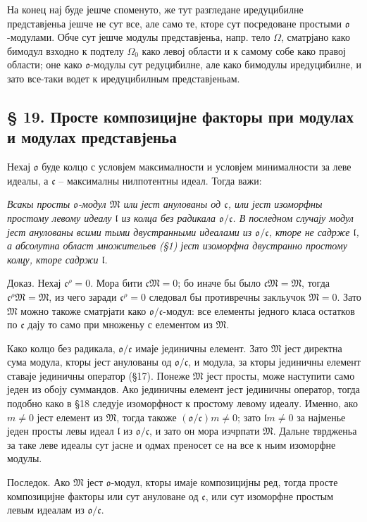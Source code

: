 ﻿\documentclass[11pt]{article}
\providecommand{\mo}{\mathfrak{o}}
\providecommand{\ml}{\mathfrak{l}}
\providecommand{\mc}{\mathfrak{c}}
\providecommand{\mM}{\mathfrak{M}}
\begin{document}
На конец нај буде јешче споменуто, же тут разгледане иредуцибилне представјеньа јешче не сут все, але само те, кторе сут посредоване простыми $\mo$-модулами. Обче сут јешче модулы представјеньа, напр. тело $\Omega$, сматрјано како бимодул взходно к подтелу $\Omega_0$ како левој области и к самому собе како правој области; оне како $\mo$-модулы сут редуцибилне, але како бимодулы иредуцибилне, и зато все-таки водет к иредуцибилным представјеньам.

\subsection*{§ 19. Просте композицијне факторы при модулах и модулах представјеньа}

Нехај $\mo$ буде колцо с условјем максималности и условјем минималности за леве идеалы, а $\mc$ -- максималны нилпотентны идеал. Тогда важи:

\emph{Всакы просты $\mo$-модул $\mM$ или јест анулованы од $\mc$, или јест изоморфны простому левому идеалу $\ml$ из колца без радикала $\mo/\mc$. В последном случају модул јест анулованы всими тыми двустранными идеалами из $\mo/\mc$, кторе не садрже $\ml$, а абсолутна област множительев (§1) јест изоморфна двустранно простому колцу, кторе садржи $\ml$.}

Доказ. Нехај $\mc^\rho=0$. Мора бити $\mc\mM=0$; бо иначе бы было $\mc\mM=\mM$, тогда $\mc^\rho\mM=\mM$, из чего заради $\mc^\rho=0$ следовал бы противречны закльучок $\mM=0$. Зато $\mM$ можно такоже сматрјати како $\mo/\mc$-модул: все елементы једного класа остатков по $\mc$ дају то само при множеньу с елементом из $\mM$.

Како колцо без радикала, $\mo/\mc$ имаје јединичны елемент. Зато $\mM$ јест директна сума модула, кторы јест анулованы од $\mo/\mc$, и модула, за кторы јединичны елемент ставаје јединичны оператор (§17). Понеже $\mM$ јест просты, може наступити само једен из обоју суммандов. Ако јединичны елемент јест јединичны оператор, тогда подобно како в §18 следује изоморфност к простому левому идеалу. Именно, ако $m\ne0$ јест елемент из $\mM$, тогда такоже $(\mo/\mc)m\ne0$; зато $\ml m\ne0$ за најменье једен просты левы идеал $\ml$ из $\mo/\mc$, и зато он мора изчрпати $\mM$. Дальне тврдженьа за таке леве идеалы сут јасне и одмах преносет се на все к ньим изоморфне модулы.

Последок. Ако $\mM$ јест $\mo$-модул, кторы имаје композицијны ред, тогда просте композицијне факторы или сут ануловане од $\mc$, или сут изоморфне простым левым идеалам из $\mo/\mc$.
\end{document}
